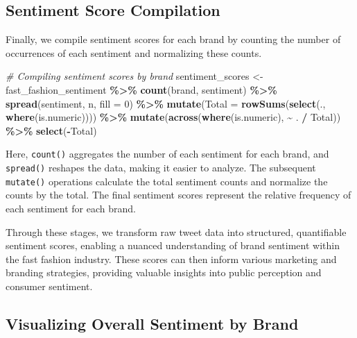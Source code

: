 \documentclass[
]{book}
\newenvironment{Shaded}{\begin{snugshade}}{\end{snugshade}}
\newcommand{\AttributeTok}[1]{\textcolor[rgb]{0.13,0.29,0.53}{#1}}
\newcommand{\CommentTok}[1]{\textcolor[rgb]{0.56,0.35,0.01}{\textit{#1}}}
\newcommand{\DecValTok}[1]{\textcolor[rgb]{0.00,0.00,0.81}{#1}}
\newcommand{\FunctionTok}[1]{\textcolor[rgb]{0.13,0.29,0.53}{\textbf{#1}}}
\newcommand{\NormalTok}[1]{#1}
\newcommand{\OtherTok}[1]{\textcolor[rgb]{0.56,0.35,0.01}{#1}}
\newcommand{\SpecialCharTok}[1]{\textcolor[rgb]{0.81,0.36,0.00}{\textbf{#1}}}
\begin{document}
\hypertarget{sentiment-score-compilation}{%
\subsection{Sentiment Score Compilation}\label{sentiment-score-compilation}}

Finally, we compile sentiment scores for each brand by counting the number of occurrences of each sentiment and normalizing these counts.

\begin{Shaded}
\begin{Highlighting}[]
\CommentTok{\# Compiling sentiment scores by brand}
\NormalTok{sentiment\_scores }\OtherTok{\textless{}{-}}\NormalTok{ fast\_fashion\_sentiment }\SpecialCharTok{\%\textgreater{}\%}
  \FunctionTok{count}\NormalTok{(brand, sentiment) }\SpecialCharTok{\%\textgreater{}\%}
  \FunctionTok{spread}\NormalTok{(sentiment, n, }\AttributeTok{fill =} \DecValTok{0}\NormalTok{) }\SpecialCharTok{\%\textgreater{}\%}
  \FunctionTok{mutate}\NormalTok{(}\AttributeTok{Total =} \FunctionTok{rowSums}\NormalTok{(}\FunctionTok{select}\NormalTok{(., }\FunctionTok{where}\NormalTok{(is.numeric)))) }\SpecialCharTok{\%\textgreater{}\%}
  \FunctionTok{mutate}\NormalTok{(}\FunctionTok{across}\NormalTok{(}\FunctionTok{where}\NormalTok{(is.numeric), }\SpecialCharTok{\textasciitilde{}}\NormalTok{ . }\SpecialCharTok{/}\NormalTok{ Total)) }\SpecialCharTok{\%\textgreater{}\%}
  \FunctionTok{select}\NormalTok{(}\SpecialCharTok{{-}}\NormalTok{Total)}
\end{Highlighting}
\end{Shaded}

Here, \texttt{count()} aggregates the number of each sentiment for each brand, and \texttt{spread()} reshapes the data, making it easier to analyze. The subsequent \texttt{mutate()} operations calculate the total sentiment counts and normalize the counts by the total. The final sentiment scores represent the relative frequency of each sentiment for each brand.

Through these stages, we transform raw tweet data into structured, quantifiable sentiment scores, enabling a nuanced understanding of brand sentiment within the fast fashion industry. These scores can then inform various marketing and branding strategies, providing valuable insights into public perception and consumer sentiment.

\hypertarget{visualizing-overall-sentiment-by-brand}{%
\subsection{Visualizing Overall Sentiment by Brand}\label{visualizing-overall-sentiment-by-brand}}
\end{document}
